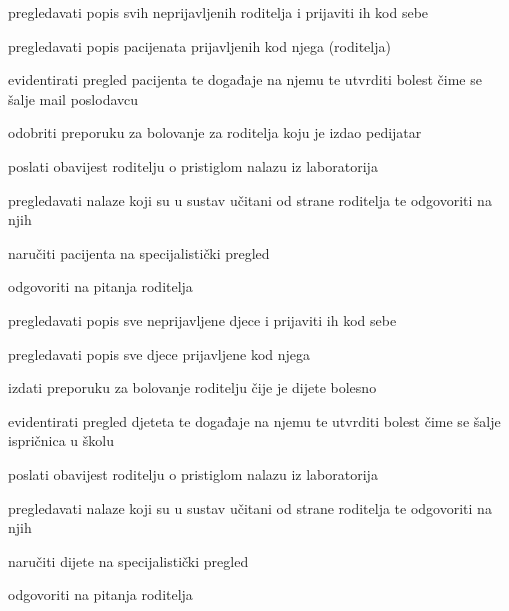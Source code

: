 \begin{packed_enum}
\begin{packed_enum}
					\item pregledavati popis svih neprijavljenih roditelja i prijaviti ih kod sebe
					\item pregledavati popis pacijenata prijavljenih kod njega (roditelja)
					\item evidentirati pregled pacijenta te događaje na njemu te utvrditi bolest čime se šalje mail poslodavcu
					\item odobriti preporuku za bolovanje za roditelja koju je izdao pedijatar
					\item poslati obavijest roditelju o pristiglom nalazu iz laboratorija
					\item pregledavati nalaze koji su u sustav učitani od strane roditelja te odgovoriti na njih
					\item naručiti pacijenta na specijalistički pregled
					\item odgovoriti na pitanja roditelja
				\end{packed_enum}
				
				\item  {}
				
				\begin{packed_enum}
					
					\item pregledavati popis sve neprijavljene djece i prijaviti ih kod sebe
					\item pregledavati popis sve djece prijavljene kod njega
					\item izdati preporuku za bolovanje roditelju čije je dijete bolesno
					\item evidentirati pregled djeteta te događaje na njemu te utvrditi bolest čime se šalje ispričnica u školu
					\item poslati obavijest roditelju o pristiglom nalazu iz laboratorija
					\item pregledavati nalaze koji su u sustav učitani od strane roditelja te odgovoriti na njih
					\item naručiti dijete na specijalistički pregled
					\item odgovoriti na pitanja roditelja
					
				\end{packed_enum}
				
				\item  {}
				
				\begin{packed_enum}
					

\end{packed_enum}
\end{packed_enum}
